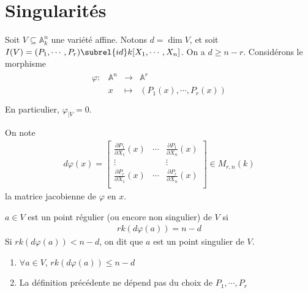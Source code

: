    \section{Singularités}
        Soit $V \subseteq \mathbb{A}^n_k$ une variété affine. Notons $d = \dim V$, et soit $I(V) = (P_1, \cdots, P_r) \subrel{id} k[X_1, \cdots, X_n]$. On a $d \geq n - r$. Considérons le morphisme
        \begin{align*}
            \begin{array}{cccc}
                \varphi : & \mathbb{A}^n & \to & \mathbb{A}^r \\
                & x & \mapsto & (P_1(x), \cdots, P_r(x)) \\
            \end{array}
        \end{align*}
        En particulier, $\varphi_{|V} = 0$.
        \begin{nota}
            On note
            \begin{align*}
                d \varphi (x) = 
                \begin{bmatrix}
                    \frac{\partial P_1}{\partial X_1}(x) & \cdots & \frac{\partial P_1}{\partial X_n}(x) \\
                    \vdots & & \vdots \\
                    \frac{\partial P_r}{\partial X_1}(x) & \cdots & \frac{\partial P_r}{\partial X_n}(x) \\
                \end{bmatrix}
                \in M_{r, n}(k)
            \end{align*}
            la matrice jacobienne de $\varphi$ en $x$.
        \end{nota}
        \begin{defi}
            $a \in V$ est un point régulier (ou encore non singulier) de $V$ si 
            \begin{align*}
                rk (d \varphi(a)) = n - d
            \end{align*}
            Si $rk (d \varphi(a)) < n - d$, on dit que $a$ est un point singulier de $V$.
        \end{defi}
        \begin{remq}
            \begin{enumerate}
                \item $\forall a \in V$, $rk (d \varphi(a)) \leq n - d$
                \item La définition précédente ne dépend pas du choix de $P_1, \cdots, P_r$
            \end{enumerate}
        \end{remq}
